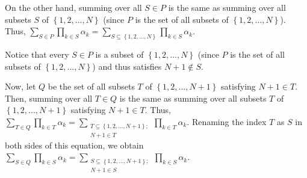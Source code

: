 \documentclass[numbers=enddot,12pt,final,onecolumn,notitlepage]{scrartcl}%
\begin{document}
On the other hand, summing over all $S\in P$ is the same as summing over all
subsets $S$ of $\left\{  1,2,...,N\right\}  $ (since $P$ is the set of all
subsets of $\left\{  1,2,...,N\right\}  $). Thus, $\sum\limits_{S\in P}%
\prod\limits_{k\in S}\alpha_{k}=\sum\limits_{S\subseteq\left\{
1,2,...,N\right\}  }\prod\limits_{k\in S}\alpha_{k}$.

Notice that every $S\in P$ is a subset of $\left\{  1,2,...,N\right\}  $
(since $P$ is the set of all subsets of $\left\{  1,2,...,N\right\}  $) and
thus satisfies $N+1\notin S$.

Now, let $Q$ be the set of all subsets $T$ of $\left\{  1,2,...,N+1\right\}  $
satisfying $N+1\in T$. Then, summing over all $T\in Q$ is the same as summing
over all subsets $T$ of $\left\{  1,2,...,N+1\right\}  $ satisfying $N+1\in
T$. Thus, $\sum\limits_{T\in Q}\prod\limits_{k\in T}\alpha_{k}=\sum
\limits_{\substack{T\subseteq\left\{  1,2,...,N+1\right\}  ;\\N+1\in T}%
}\prod\limits_{k\in T}\alpha_{k}$. Renaming the index $T$ as $S$ in both sides
of this equation, we obtain $\sum\limits_{S\in Q}\prod\limits_{k\in S}%
\alpha_{k}=\sum\limits_{\substack{S\subseteq\left\{  1,2,...,N+1\right\}
;\\N+1\in S}}\prod\limits_{k\in S}\alpha_{k}$.
\end{document}
